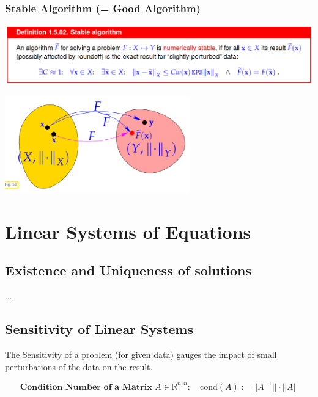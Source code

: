 \documentclass[12pt, a4paper]{article}
\newcommand{\R}{\mathbb{R}}
\begin{document}
\subsubsection{Stable Algorithm (= Good Algorithm)}
\begin{center}
	 \includegraphics[width=1.0\textwidth]{stable_algorithm1.png}
\end{center}

\begin{center}
	 \includegraphics[width=0.6\textwidth]{stable_algorithm2.png}
\end{center}

\newpage
\section{Linear Systems of Equations}

\subsection{Existence and Uniqueness of solutions}
...

\subsection{Sensitivity of Linear Systems}

The Sensitivity of a problem (for given data) gauges the impact of small perturbations of the data on the result. \\

\begin{tcolorbox}
		\vspace{-5mm}
	\begin{equation*}
	\textbf{Condition Number of a Matrix } A \in \R^{n,n}:\quad \text{cond}(A) := ||A^{-1}||\cdot||A||
	\end{equation*}
\end{tcolorbox}
\end{document}
